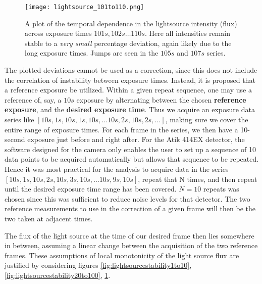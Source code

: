\documentclass[../main.tex]{subfiles}
\begin{document}
		\begin{figure}
			\centering			\texttt{[image: lightsource\_101to110.png]}
			\caption{A plot of the temporal dependence in the lightsource intensity (flux) across exposure times $101s, 102s \dots 110s$. Here all intensities remain stable to a \textit{very small} percentage deviation, again likely due to the long exposure times. Jumps are seen in the $105s$ and $107s$ series.  }
			\label{fig:lightsourcestability101to110}
		\end{figure}
		
		The plotted deviations cannot be used as a correction, since this does not include the correlation of instability between exposure times. Instead, it is proposed that a reference exposure be utilized. Within a given repeat sequence, one may use a reference of, say, a $10s$ exposure by alternating between the chosen \textbf{reference exposure}, and the \textbf{desired exposure time}. Thus we acquire an exposure data series like $[10s, 1s, 10s, 1s, 10s, \dots 10s, 2s, 10s, 2s,\dots]$, making sure we cover the entire range of exposure times. For each frame in the series, we then have a 10-second exposure just before and right after. For the Atik 414EX detector, the software designed for the camera only enables the user to set up a sequence of 10 data points to be acquired automatically but allows that sequence to be repeated. Hence it was most practical for the analysis to acquire data in the series $[10s, 1s, 10s, 2s, 10s, 3s, 10s, \dots 10s, 9s, 10s]$, repeat that N times, and then repeat until the desired exposure time range has been covered. $N=10$ repeats was chosen since this was sufficient to reduce noise levels for that detector. The two reference measurements to use in the correction of a given frame will then be the two taken at adjacent times. 
		
		The flux of the light source at the time of our desired frame then lies somewhere in between, assuming a linear change between the acquisition of the two reference frames. These assumptions of local monotonicity of the light source flux are justified by considering figures \ref{fig:lightsourcestability1to10},  \ref{fig:lightsourcestability20to100},  \ref{fig:lightsourcestability101to110}. 
		
\end{document}
